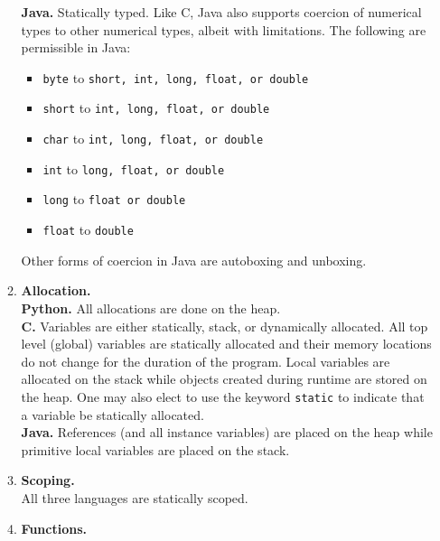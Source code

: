 \documentclass[9pt]{article}
\begin{document}
\begin{enumerate}
\begin{enumerate}
               \textbf{Java.} Statically typed. Like C, Java also supports
               coercion of numerical types to other numerical types, albeit with
               limitations. The following are permissible in Java:
               \begin{itemize}
                  \item \verb|byte| to \verb|short, int, long, float, or double|
                  \item \verb|short| to \verb|int, long, float, or double|
                  \item \verb|char| to \verb|int, long, float, or double|
                  \item \verb|int| to \verb|long, float, or double|
                  \item \verb|long| to \verb|float or double|
                  \item \verb|float| to \verb|double|
               \end{itemize}
               
               Other forms of coercion in Java are autoboxing and unboxing.
         \item \textbf{Allocation.} \\
         
               \textbf{Python.} All allocations are done on the heap. \\
               
               \textbf{C.} Variables are either statically, stack, or
               dynamically allocated. All top level (global) variables are
               statically allocated and their memory locations do not change for
               the duration of the program.  Local variables are allocated on
               the stack while objects created during runtime are stored on the
               heap. One may also elect to use the keyword \verb|static| to
               indicate that a variable be statically allocated. \\
               
               \textbf{Java.} References (and all instance variables) are placed
               on the heap while primitive local variables are placed on the
               stack.
         \item \textbf{Scoping.} \\
         
               All three languages are statically scoped.
         \item \textbf{Functions.} \\
         

\end{enumerate}
\end{enumerate}
\end{document}
